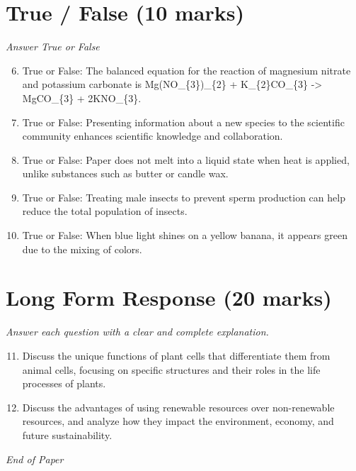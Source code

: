 \documentclass[12pt]{article}
\begin{document}
\section*{True / False (10 marks)}
\textit{Answer True or False}
\begin{enumerate}[label=\arabic*.]
\setcounter{enumi}{5}
\item True or False: The balanced equation for the reaction of magnesium nitrate and potassium carbonate is Mg(NO\_\{3\})\_\{2\} + K\_\{2\}CO\_\{3\} -\textgreater{} MgCO\_\{3\} + 2KNO\_\{3\}.
\item True or False: Presenting information about a new species to the scientific community enhances scientific knowledge and collaboration.
\item True or False: Paper does not melt into a liquid state when heat is applied, unlike substances such as butter or candle wax.
\item True or False: Treating male insects to prevent sperm production can help reduce the total population of insects.
\item True or False: When blue light shines on a yellow banana, it appears green due to the mixing of colors.
\end{enumerate}

\section*{Long Form Response (20 marks)}
\textit{Answer each question with a clear and complete explanation.}
\begin{enumerate}[label=\arabic*.]
\setcounter{enumi}{10}
\item Discuss the unique functions of plant cells that differentiate them from animal cells,
focusing on specific structures and their roles in the life processes of plants.
\item Discuss the advantages of using renewable resources over non-renewable resources, and
analyze how they impact the environment, economy, and future sustainability.
\end{enumerate}

\vfill
\noindent\textit{End of Paper}
\end{document}

